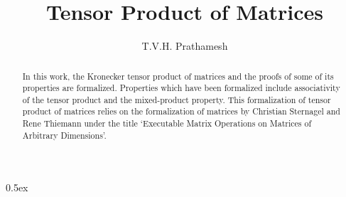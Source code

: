 \documentclass[11pt,a4paper]{article}
\begin{document}
\title{Tensor Product of Matrices}
\author{T.V.H. Prathamesh}
\maketitle

\begin{abstract}
In this work, the Kronecker tensor product of matrices and the proofs of some of its properties are formalized. Properties which have been formalized include associativity of the tensor product and the mixed-product property. This formalization of tensor product of matrices relies on the formalization of matrices by Christian Sternagel and Rene Thiemann under the title
 `Executable Matrix Operations on Matrices of Arbitrary Dimensions'. 
\end{abstract}

\tableofcontents

\parindent 0pt\parskip 0.5ex


\end{document}
